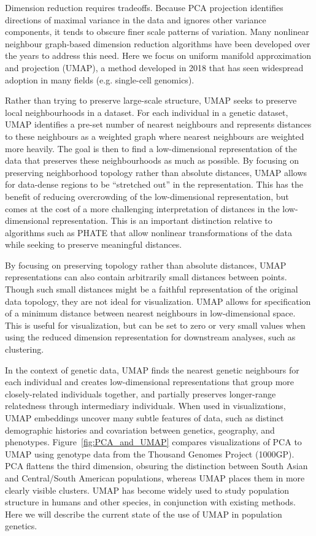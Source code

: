 \documentclass[12pt]{article}
\begin{document}
Dimension reduction requires tradeoffs. Because PCA projection identifies directions of maximal variance in the data and ignores other variance components, it tends to obscure finer scale patterns of variation.  Many nonlinear neighbour graph-based dimension reduction algorithms have been developed over the years to address this need. Here we focus on uniform manifold approximation and projection (UMAP)\cite{mcinnes_umap_2018}, a method developed in 2018 that has seen widespread adoption in many fields (e.g. single-cell genomics\cite{becht_dimensionality_2019}). 

Rather than trying to preserve large-scale structure, UMAP seeks to preserve local neighbourhoods in a dataset. For each individual in a genetic dataset, UMAP identifies a pre-set number of nearest neighbours and represents distances to these neighbours as a weighted graph where nearest neighbours are weighted more heavily. The goal is then to find a low-dimensional representation of the data that preserves these neighbourhoods as much as possible. By focusing on preserving neighborhood topology rather than absolute distances, UMAP allows for data-dense regions to be ``stretched out'' in the representation. This has the benefit of reducing overcrowding of the low-dimensional representation, but comes at the cost of a more challenging interpretation of distances in the low-dimensional representation.  This is an important distinction relative to algorithms such as PHATE \cite{moon2019visualizing} that allow nonlinear transformations of the data while seeking to preserve meaningful distances. 

By focusing on preserving topology rather than absolute distances, UMAP representations can also contain arbitrarily small distances between points. Though such small distances might be a faithful representation of the original data topology, they are not ideal for visualization. UMAP allows for specification of a minimum distance between nearest neighbours in low-dimensional space. This is useful for visualization, but can be set to zero or very small values when using the reduced dimension representation for downstream analyses, such as clustering.

In the context of genetic data, UMAP finds the nearest genetic neighbours for each individual and creates low-dimensional representations that group more closely-related individuals together, and partially preserves longer-range relatedness through intermediary individuals. When used in visualizations, UMAP embeddings uncover many subtle features of data, such as distinct demographic histories and covariation between genetics, geography, and phenotypes\cite{diaz-papkovich_umap_2019}. Figure~\ref{fig:PCA_and_UMAP} compares visualizations of PCA to UMAP using genotype data from the Thousand Genomes Project (1000GP)\cite{10002015global}. PCA flattens the third dimension, obsuring the distinction between South Asian and Central/South American populations, whereas UMAP places them in more clearly visible clusters. UMAP has become widely used to study population structure in humans and other species, in conjunction with existing methods. Here we will describe the current state of the use of UMAP in population genetics.
\end{document}
